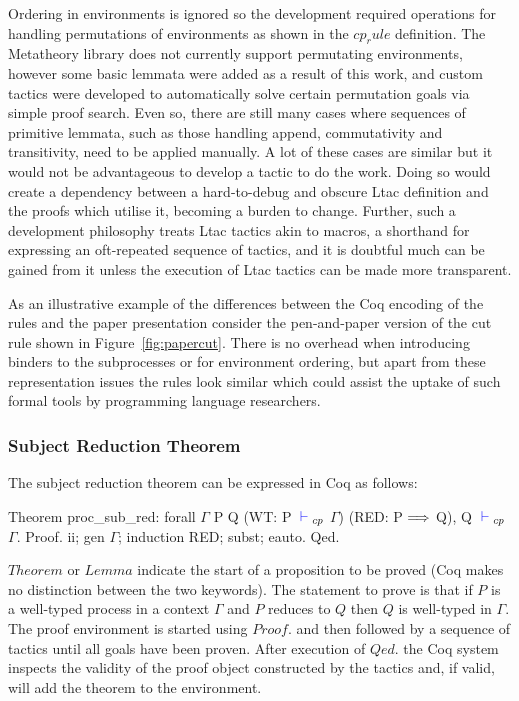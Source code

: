 Ordering in environments is ignored so the development required operations for
handling permutations of environments as shown in the \coqe$cp_rule$
definition. The Metatheory library does not currently support permutating
environments, however some basic lemmata were added as a result of this work,
and custom tactics were developed to automatically solve certain permutation
goals via simple proof search. Even so, there are still many cases where
sequences of primitive lemmata, such as those handling append, commutativity
and transitivity, need to be applied manually. A lot of these cases are
similar but it would not be advantageous to develop a tactic to do the
work. Doing so would create a dependency between a hard-to-debug and obscure
Ltac definition and the proofs which utilise it, becoming a burden to
change. Further, such a development philosophy treats Ltac tactics akin to
macros, a shorthand for expressing an oft-repeated sequence of tactics, and it
is doubtful much can be gained from it unless the execution of Ltac tactics
can be made more transparent.

As an illustrative example of the differences between the Coq encoding of the
rules and the paper presentation consider the pen-and-paper version of the cut
rule shown in Figure~\ref{fig:papercut}. There is no overhead when introducing
binders to the subprocesses or for environment ordering, but apart from these
representation issues the rules look similar which could assist the uptake of
such formal tools by programming language researchers.

\subsubsection{Subject Reduction Theorem}

The subject reduction theorem can be expressed in Coq as follows:
\begin{coq}
Theorem proc_sub_red:
  forall $\Gamma$ P Q
         (WT: P ${\color{blue} {} \vdash {}}_{cp}$ $\Gamma$)
         (RED: P $\Longrightarrow$ Q),
    Q ${\color{blue} {} \vdash {}}_{cp}$ $\Gamma$.
Proof. ii; gen $\Gamma$; induction RED; subst; eauto. Qed.
\end{coq}

\coqe$Theorem$ or \coqe$Lemma$ indicate the start of a proposition to be
proved (Coq makes no distinction between the two keywords). The statement to
prove is that if \coqe$P$ is a well-typed process in a context $\Gamma$ and
\coqe$P$ reduces to \coqe$Q$ then \coqe$Q$ is well-typed in $\Gamma$. The
proof environment is started using \coqe$Proof.$ and then followed by a
sequence of tactics until all goals have been proven. After execution of
\coqe$Qed.$ the Coq system inspects the validity of the proof object
constructed by the tactics and, if valid, will add the theorem to the
environment.

